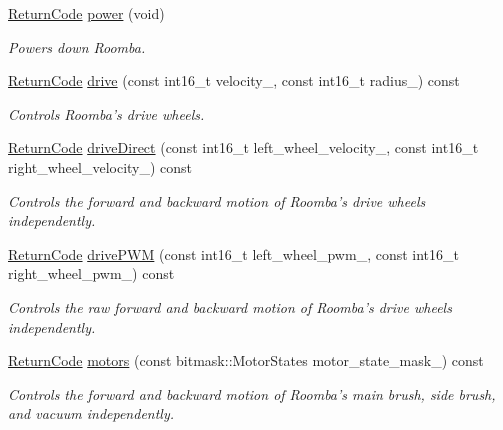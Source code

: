 \begin{DoxyCompactItemize}
\hyperlink{classroomba_1_1series500_1_1oi_1_1_o_i_encoder_ac2c8ad2f0306050926f89882d74696cc}{Return\+Code} \hyperlink{classroomba_1_1series500_1_1oi_1_1_o_i_encoder_a1e7270f7d8fc1c19659c08135c619f03}{power} (void)
\begin{DoxyCompactList}\small\item\em Powers down Roomba. \end{DoxyCompactList}\item 
\hyperlink{classroomba_1_1series500_1_1oi_1_1_o_i_encoder_ac2c8ad2f0306050926f89882d74696cc}{Return\+Code} \hyperlink{classroomba_1_1series500_1_1oi_1_1_o_i_encoder_aea532d32e746df738e58e8ccdb74cf0c}{drive} (const int16\+\_\+t velocity\+\_\+, const int16\+\_\+t radius\+\_\+) const 
\begin{DoxyCompactList}\small\item\em Controls Roomba’s drive wheels. \end{DoxyCompactList}\item 
\hyperlink{classroomba_1_1series500_1_1oi_1_1_o_i_encoder_ac2c8ad2f0306050926f89882d74696cc}{Return\+Code} \hyperlink{classroomba_1_1series500_1_1oi_1_1_o_i_encoder_acd959b32a171bbd588bd01d6799f3ec2}{drive\+Direct} (const int16\+\_\+t left\+\_\+wheel\+\_\+velocity\+\_\+, const int16\+\_\+t right\+\_\+wheel\+\_\+velocity\+\_\+) const 
\begin{DoxyCompactList}\small\item\em Controls the forward and backward motion of Roomba’s drive wheels independently. \end{DoxyCompactList}\item 
\hyperlink{classroomba_1_1series500_1_1oi_1_1_o_i_encoder_ac2c8ad2f0306050926f89882d74696cc}{Return\+Code} \hyperlink{classroomba_1_1series500_1_1oi_1_1_o_i_encoder_a4059279c20999fa10ff6b137f06c3ea6}{drive\+P\+W\+M} (const int16\+\_\+t left\+\_\+wheel\+\_\+pwm\+\_\+, const int16\+\_\+t right\+\_\+wheel\+\_\+pwm\+\_\+) const 
\begin{DoxyCompactList}\small\item\em Controls the raw forward and backward motion of Roomba’s drive wheels independently. \end{DoxyCompactList}\item 
\hyperlink{classroomba_1_1series500_1_1oi_1_1_o_i_encoder_ac2c8ad2f0306050926f89882d74696cc}{Return\+Code} \hyperlink{classroomba_1_1series500_1_1oi_1_1_o_i_encoder_a828609a0ba48ceb31d2ce674e69e4951}{motors} (const bitmask\+::\+Motor\+States motor\+\_\+state\+\_\+mask\+\_\+) const 
\begin{DoxyCompactList}\small\item\em Controls the forward and backward motion of Roomba’s main brush, side brush, and vacuum independently. \end{DoxyCompactList}\item 

\end{DoxyCompactItemize}
